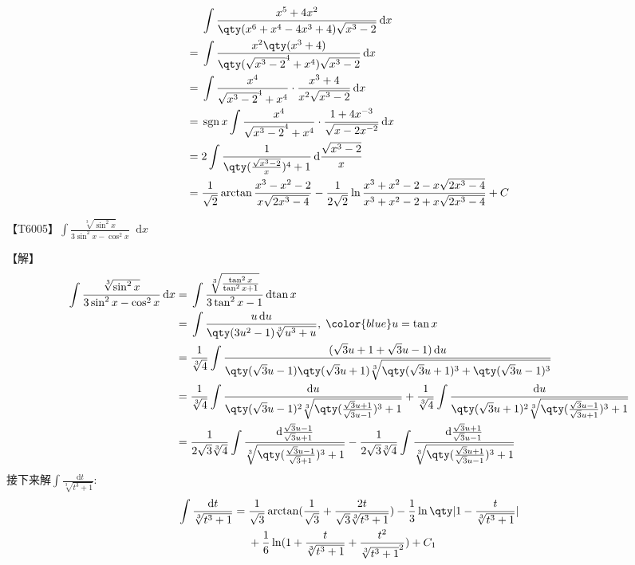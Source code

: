 \documentclass{ctexbook}
\DeclareMathOperator{\sgn}{sgn}
\newcommand*{\dif}{\mathop{}\!\mathrm{d}}
\begin{document}
{\begin{align*}
{}&\int\frac{x^{5}+4x^{2}}{\qty(x^{6}+x^{4}-4x^{3}+4)\sqrt{x^{3}-2}}\dif{x}\\
={}&\int\frac{x^{2}\qty(x^{3}+4)}{\qty(\sqrt{x^{3}-2}^{4}+x^{4})\sqrt{x^{3}-2}}\dif{x}\\
={}&\int\frac{x^{4}}{\sqrt{x^{3}-2}^{4}+x^{4}}\cdot\frac{x^{3}+4}{x^{2}\sqrt{x^{3}-2}}\dif{x}\\
={}&\sgn{x}\int\frac{x^{4}}{\sqrt{x^{3}-2}^{4}+x^{4}}\cdot\frac{1+4x^{-3}}{\sqrt{x-2x^{-2}}}\dif{x}\\
={}&2\int\frac{1}{\qty(\frac{\sqrt{x^{3}-2}}{x})^{4}+1}\dif{\frac{\sqrt{x^{3}-2}}{x}}\\
={}&\frac{1}{\sqrt{2}}\arctan{\frac{x^{3}-x^{2}-2}{x\sqrt{2x^{3}-4}}}-\frac{1}{2\sqrt{2}}\ln{\frac{x^{3}+x^{2}-2-x\sqrt{2x^{3}-4}}{x^{3}+x^{2}-2+x\sqrt{2x^{3}-4}}}+C
\end{align*}\par
【T6005】$\int\frac{\sqrt[3]{\sin^{2}{x}}}{3\sin^{2}{x}-\cos^{2}{x}}\dif{x}$\par
【解】
\begin{align*}
\int\frac{\sqrt[3]{\sin^{2}{x}}}{3\sin^{2}{x}-\cos^{2}{x}}\dif{x}={}&\int\frac{\sqrt[3]{\frac{\tan^{2}{x}}{\tan^{2}{x}+1}}}{3\tan^{2}{x}-1}\dif{\tan{x}}\\
={}&\int\frac{u\dif{u}}{\qty(3u^{2}-1)\sqrt[3]{u^{3}+u}},\;{\color{blue}u=\tan{x}}\\
={}&\frac{1}{\sqrt[3]{4}}\int\frac{(\sqrt{3}u+1+\sqrt{3}u-1)\dif{u}}{\qty(\sqrt{3}u-1)\qty(\sqrt{3}u+1)\sqrt[3]{\qty(\sqrt{3}u+1)^{3}+\qty(\sqrt{3}u-1)^{3}}}\\
={}&\frac{1}{\sqrt[3]{4}}\int\frac{\dif{u}}{\qty(\sqrt{3}u-1)^{2}\sqrt[3]{\qty(\frac{\sqrt{3}u+1}{\sqrt{3}u-1})^{3}+1}}+\frac{1}{\sqrt[3]{4}}\int\frac{\dif{u}}{\qty(\sqrt{3}u+1)^{2}\sqrt[3]{\qty(\frac{\sqrt{3}u-1}{\sqrt{3}u+1})^{3}+1}}\\
={}&\frac{1}{2\sqrt{3}\sqrt[3]{4}}\int\frac{\dif{\frac{\sqrt{3}u-1}{\sqrt{3}u+1}}}{\sqrt[3]{\qty(\frac{\sqrt{3}u-1}{\sqrt{3}+1})^{3}+1}}-\frac{1}{2\sqrt{3}\sqrt[3]{4}}\int\frac{\dif{\frac{\sqrt{3}u+1}{\sqrt{3}u-1}}}{\sqrt[3]{\qty(\frac{\sqrt{3}u+1}{\sqrt{3}u-1})^{3}+1}}
\end{align*}
接下来解$\int\frac{\dif{t}}{\sqrt[3]{t^{3}+1}}$:
\begin{align*}
\int\frac{\dif{t}}{\sqrt[3]{t^{3}+1}}={}&\frac{1}{\sqrt{3}}\arctan(\frac{1}{\sqrt{3}}+\frac{2t}{\sqrt{3}\sqrt[3]{t^{3}+1}})-\frac{1}{3}\ln\qty|1-\frac{t}{\sqrt[3]{t^{3}+1}}|\\
{}&+\frac{1}{6}\ln(1+\frac{t}{\sqrt[3]{t^{3}+1}}+\frac{t^{2}}{\sqrt[3]{t^{3}+1}^{2}})+C_{1}

\end{align*}}
\end{document}

